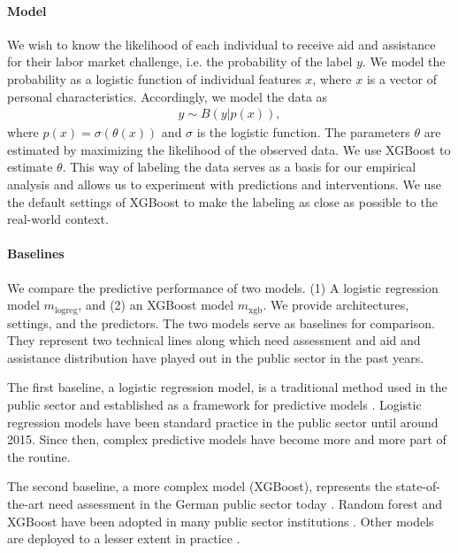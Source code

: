 \documentclass{article} %
\begin{document}
\paragraph{Model}
We wish to know the likelihood of each individual to receive aid and assistance for their labor market challenge, i.e. the probability of the label $y$. We model the probability as a logistic function of individual features $x$, where $x$ is a vector of personal characteristics. Accordingly, we model the data as
\begin{align*}
y\sim B(y|p(x)),
\end{align*}
where $p(x)=\sigma(\theta(x))$ and $\sigma$ is the logistic function. The parameters $\theta$ are estimated by maximizing the likelihood of the observed data. We use XGBoost to estimate $\theta$. This way of labeling the data serves as a basis for our empirical analysis and allows us to experiment with predictions and interventions. We use the default settings of XGBoost to make the labeling as close as possible to the real-world context.

\paragraph{Baselines}

We compare the predictive performance of two models. (1) A logistic regression model $m_{\mathrm{logreg}}$, and (2) an XGBoost model $m_{\mathrm{xgb}}$. We provide architectures, settings, and the predictors. The two models serve as baselines for comparison. They represent two technical lines along which need assessment and aid and assistance distribution have played out in the public sector in the past years.

The first baseline, a logistic regression model, is a traditional method used in the public sector and established as a framework for predictive models \citep{desiereUsingArtificialIntelligence2021,kortner2023predictive,loxha2014profiling}. Logistic regression models have been standard practice in the public sector until around 2015. Since then, complex predictive models have become more and more part of the routine.

The second baseline, a more complex model (XGBoost), represents the state-of-the-art need assessment in the German public sector today \citep{Bach_Kern_Mautner_Kreuter_2023, sun2019mapping, wirtz2019artificial}. Random forest and XGBoost have been adopted in many public sector institutions . Other models are deployed to a lesser extent in practice \citep{Bach_Kern_Mautner_Kreuter_2023}.
\end{document}
